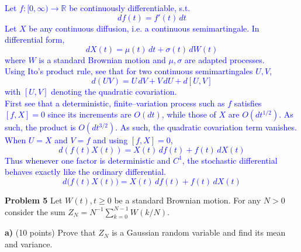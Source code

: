 \documentclass{article}
\begin{document}
    \textcolor{blue}{
Let $f:[0,\infty)\!\to\!\mathbb R$ be continuously differentiable, s.t.
$$
df(t)=f'(t)\,dt
$$
Let $X$ be any continuous diffusion, i.e. a continuous semimartingale. In differential form,
$$
dX(t)=\mu(t)\,dt+\sigma(t)\,dW(t)
$$
where $W$ is a standard Brownian motion and $\mu,\sigma$ are adapted processes. \\
Using Ito's product rule, see that for two continuous semimartingales $U,V$,
$$
d(UV)=U\,dV+V\,dU+d[U,V]
$$
with $[U,V]$ denoting the quadratic covariation. \\
First see that a deterministic, finite–variation process such as $f$ satisfies $[f,X]=0$ since its increments are $O(dt)$, while those of $X$ are $O(dt^{1/2})$. As such, the product is $O(dt^{3/2})$. As such, the quadratic covariation term vanishes. \\
When $U=X$ and $V=f$ and using $[f,X]=0$,
$$
d(f(t)X(t))=X(t)\,df(t)+f(t)\,dX(t)
$$
Thus whenever one factor
is deterministic and $C^{1}$, the stochastic differential behaves exactly like
the ordinary differential.
\[
\,d\!\bigl(f(t)X(t)\bigr)=X(t)\,df(t)+f(t)\,dX(t)\,
\]
}



\textbf{Problem 5}   Let $W(t), t \geq 0$ be a standard Brownian motion. For any $N > 0$ consider the sum
$Z_N = N^{-1} \sum_{k=0}^{N-1} W(k/N).$

\textbf{a)}   (10 points) Prove that $Z_N$ is a Gaussian random variable and find its mean and variance.
\end{document}

